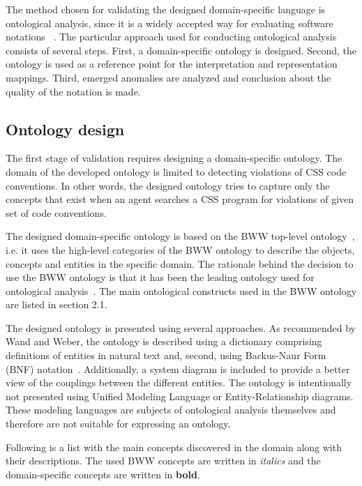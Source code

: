 The method chosen for validating the designed domain-specific language is
ontological analysis, since it is a widely accepted way for evaluating
software notations
~\cite{opdahl2002ontological,green2000integrated,moody2009physics,parsons1997using,weber1996analytical}.
The particular approach used for conducting ontological analysis consists of
several steps. First, a domain-specific ontology is designed. Second, the
ontology is used as a reference point for the interpretation and
representation mappings. Third, emerged anomalies are analyzed and conclusion
about the quality of the notation is made.

\subsection{Ontology design}

The first stage of validation requires designing a domain-specific ontology. The domain of the
developed ontology is limited to detecting violations of CSS code conventions. In other words, the
designed ontology tries to capture only the concepts that exist when an agent searches a CSS program
for violations of given set of code conventions.

The designed domain-specific ontology is based on the BWW top-level
ontology~\cite{wand1990ontological}, i.e. it uses the high-level categories of
the BWW ontology to describe the objects, concepts and entities in the
specific domain. The rationale behind the decision to use the BWW ontology is that
it has been the leading ontology used for ontological
analysis~\cite{moody2009physics}. The main ontological constructs used in the
BWW ontology are listed in section 2.1.

The designed ontology is presented using several approaches. As recommended by
Wand and Weber, the ontology is described using a dictionary comprising
definitions of entities in natural text and, second, using Backus-Naur Form
(BNF) notation~\cite{wand1995deep,rosemann2002developing}. Additionally, a
system diagram is included to provide a better view of the couplings between
the different entities. The ontology is intentionally not presented using
Unified Modeling Language or Entity-Relationship diagrams. These modeling
languages are subjects of ontological analysis themselves and therefore are
not suitable for expressing an ontology.

Following is a list with the main concepts discovered in the domain along with
their descriptions. The used BWW concepts are written in \textit{italics} and
the domain-specific concepts are written in \textbf{bold}.

